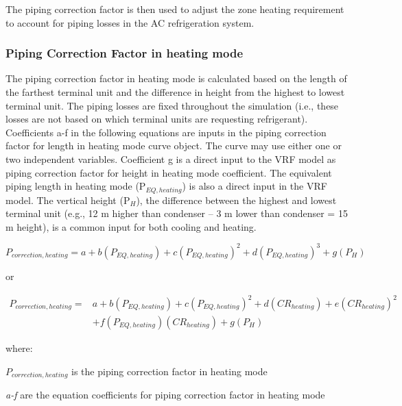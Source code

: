 The piping correction factor is then used to adjust the zone heating requirement to account for piping losses in the AC refrigeration system.

\subsubsection{Piping Correction Factor in heating mode}\label{piping-correction-factor-in-heating-mode}

The piping correction factor in heating mode is calculated based on the length of the farthest terminal unit and the difference in height from the highest to lowest terminal unit. The piping losses are fixed throughout the simulation (i.e., these losses are not based on which terminal units are requesting refrigerant). Coefficients a-f in the following equations are inputs in the piping correction factor for length in heating mode curve object. The curve may use either one or two independent variables. Coefficient g is a direct input to the VRF model as piping correction factor for height in heating mode coefficient. The equivalent piping length in heating mode (P\(_{EQ,heating}\)) is also a direct input in the VRF model. The vertical height (P\(_H\)), the difference between the highest and lowest terminal unit (e.g., 12 m higher than condenser – 3 m lower than condenser = 15 m height), is a common input for both cooling and heating.

\begin{equation}
  P_{correction,heating} = a + b \left( P_{EQ,heating} \right) + c \left( P_{EQ,heating} \right)^2 + d \left( P_{EQ,heating} \right)^3 + g \left( P_H \right)
\end{equation}

or

\begin{equation}
\begin{array}{rl}
{P_{correction,heating}} =& a + b \left( P_{EQ,heating} \right) + c \left( P_{EQ,heating} \right)^2 + d \left( CR_{heating} \right) + e \left( CR_{heating} \right)^2 \\
 & + f \left( P_{EQ,heating} \right) \left( CR_{heating} \right) + g \left( P_H \right)
\end{array}
\end{equation}

where:

\(P_{correction,heating}\) is the piping correction factor in heating mode

\emph{a-f} are the equation coefficients for piping correction factor in heating mode

